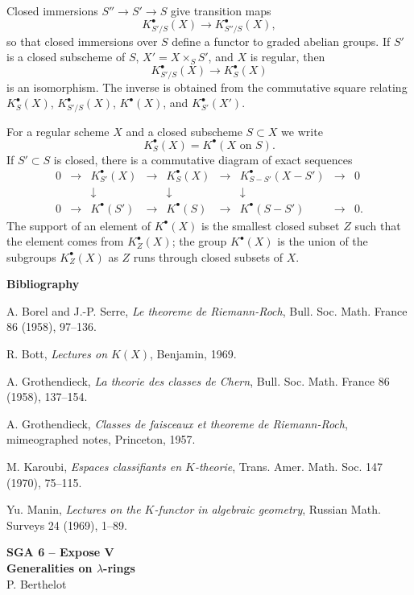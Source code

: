 \documentclass[11pt]{article}
\theoremstyle{plain}
\theoremstyle{definition}
\theoremstyle{remark}
\begin{document}
Closed immersions $S''\to S'\to S$ give transition maps
\[
K^{\bullet}_{S'/S}(X)\to K^{\bullet}_{S''/S}(X),
\]
so that closed immersions over $S$ define a functor to graded abelian groups. If $S'$ is a closed subscheme of $S$, $X'=X\times_SS'$, and $X$ is regular, then
\[
K^{\bullet}_{S'/S}(X)\longrightarrow K^{\bullet}_S(X)
\]
is an isomorphism. The inverse is obtained from the commutative square relating $K^{\bullet}_S(X)$, $K^{\bullet}_{S'/S}(X)$, $K^{\bullet}(X)$, and $K^{\bullet}_{S'}(X')$.

For a regular scheme $X$ and a closed subscheme $S\subset X$ we write
\[
K^{\bullet}_S(X)=K^{\bullet}(X\text{ on }S).
\]
If $S'\subset S$ is closed, there is a commutative diagram of exact sequences
\[
\begin{array}{ccccccccc}
0&\to&K^{\bullet}_{S'}(X)&\to&K^{\bullet}_S(X)&\to&K^{\bullet}_{S-S'}(X-S')&\to&0\\
&&\downarrow&&\downarrow&&\downarrow&&\\
0&\to&K^{\bullet}(S')&\to&K^{\bullet}(S)&\to&K^{\bullet}(S-S')&\to&0.
\end{array}
\]
The support of an element of $K^{\bullet}(X)$ is the smallest closed subset $Z$ such that the element comes from $K^{\bullet}_Z(X)$; the group $K^{\bullet}(X)$ is the union of the subgroups $K^{\bullet}_Z(X)$ as $Z$ runs through closed subsets of $X$.

\begin{center}\textbf{Bibliography}\end{center}
A. Borel and J.-P. Serre, \emph{Le theoreme de Riemann-Roch}, Bull. Soc. Math. France 86 (1958), 97--136.\par
R. Bott, \emph{Lectures on $K(X)$}, Benjamin, 1969.\par
A. Grothendieck, \emph{La theorie des classes de Chern}, Bull. Soc. Math. France 86 (1958), 137--154.\par
A. Grothendieck, \emph{Classes de faisceaux et theoreme de Riemann-Roch}, mimeographed notes, Princeton, 1957.\par
M. Karoubi, \emph{Espaces classifiants en $K$-theorie}, Trans. Amer. Math. Soc. 147 (1970), 75--115.\par
Yu. Manin, \emph{Lectures on the $K$-functor in algebraic geometry}, Russian Math. Surveys 24 (1969), 1--89.

\newpage
\begin{center}
{\Large\textbf{SGA 6 -- Expose V}}\\[0.35em]
{\large\textbf{Generalities on $\lambda$-rings}}\\[0.25em]
{\large P. Berthelot}
\end{center}
\end{document}
